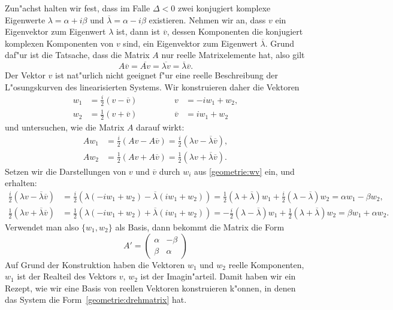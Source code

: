 Zun"achst halten wir fest, dass im Falle $\Delta<0$ zwei konjugiert
%
komplexe Eigenwerte
$
\lambda= \alpha + i\beta
$
und
$
\overline{\lambda}= \alpha - i\beta
$
existieren.
Nehmen wir an, dass $v$ ein Eigenvektor zum Eigenwert $\lambda$ ist,
dann ist $\overline{v}$, dessen Komponenten die konjugiert komplexen
Komponenten von $v$ sind, ein Eigenvektor zum Eigenwert $\overline{\lambda}$.
Grund daf"ur ist die Tatsache, dass die Matrix $A$ nur reelle Matrixelemente
hat, also gilt
\[
A\overline{v}
=
\overline{Av}
=
\overline{\lambda v}=\overline{\lambda}\overline{v}.
\]
Der Vektor $v$ ist nat"urlich nicht geeignet f"ur eine reelle Beschreibung
der L"osungskurven des linearisierten Systems.
Wir konstruieren daher die Vektoren
\begin{equation}
\begin{aligned}
w_1&=\frac{i}2(v-\overline v)
&&\qquad
&
v&=-iw_1+w_2,
\\
w_2&=\frac12(v+\overline v)
&&\qquad
&
\overline{v}&=iw_1+w_2
\end{aligned}
\label{geometrie:wv}
\end{equation}
und untersuchen, wie die Matrix $A$ darauf wirkt:
\begin{align*}
Aw_1
&=
\frac{i}2(Av-A\overline v)
=
\frac{i}2(\lambda v-\overline{\lambda}\overline{v}),
\\
Aw_2
&=
\frac12(Av+A\overline{v})
=
\frac12(\lambda v+\overline{\lambda}\overline{v}).
\end{align*}
Setzen wir die Darstellungen von $v$ und $\overline{v}$ durch $w_i$ aus 
\eqref{geometrie:wv} ein, und erhalten:
\begin{align*}
\frac{i}2(\lambda v-\overline{\lambda}\overline{v})
&=
\frac{i}2(\lambda(-iw_1+w_2) -\overline{\lambda}(iw_1+w_2))
=
\frac{1}2(\lambda+\overline{\lambda}) w_1
+
\frac{i}2(\lambda-\overline{\lambda}) w_2
=\alpha w_1-\beta w_2,
\\
\frac12(\lambda v+\overline{\lambda}\overline{v})
&=
\frac12(\lambda(-iw_1+w_2)+\overline{\lambda}(iw_1+w_2))
=
-\frac{i}2(\lambda-\overline{\lambda}) w_1
+
\frac12(\lambda+\overline{\lambda}) w_2
=\beta w_1+\alpha w_2.
\end{align*}
Verwendet man also $\{w_1,w_2\}$ als Basis, dann bekommt die Matrix die
Form
\begin{equation}
A'=\begin{pmatrix}
\alpha&-\beta\\
\beta &\alpha
\end{pmatrix}
\label{geometrie:drehmatrix}
\end{equation}
Auf Grund der Konstruktion haben die Vektoren $w_1$ und $w_2$ reelle
Komponenten, $w_1$ ist der Realteil des Vektors $v$, $w_2$ ist
der Imagin"arteil.
Damit haben wir ein Rezept, wie wir eine Basis von reellen Vektoren
konstruieren k"onnen, in denen das System die
Form~\eqref{geometrie:drehmatrix} hat.

